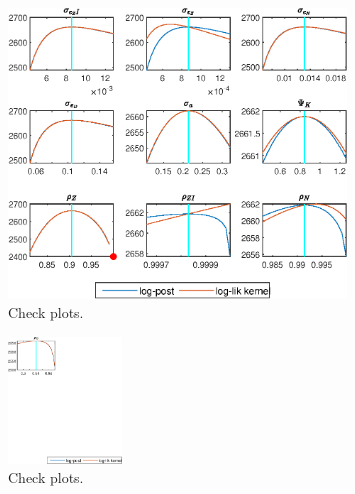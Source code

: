  
\begin{figure}[H]
\centering 
\includegraphics[width=0.80\textwidth]{BRS_extended_fd/graphs/BRS_extended_fd_CheckPlots1}
\caption{Check plots.}\label{Fig:CheckPlots:1}
\end{figure}
 
\begin{figure}[H]
\centering 
\includegraphics[width=0.27\textwidth]{BRS_extended_fd/graphs/BRS_extended_fd_CheckPlots2}
\caption{Check plots.}\label{Fig:CheckPlots:2}
\end{figure}
 
